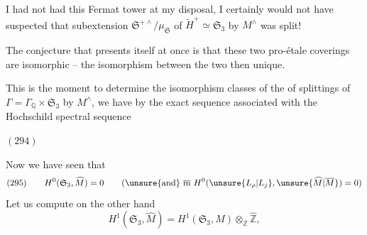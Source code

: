 I had not had this Fermat tower at my disposal, I certainly would not have suspected that  subextension $\mathfrak S^{+\wedge}/\mu_{\mathfrak S}$  of $\widetilde H^+\simeq\mathfrak S_3$ by $M^{\wedge}$ was split!

The conjecture that presents itself at once is that these two pro-étale coverings are isomorphic -- the isomorphism between the two  then unique.


 This is the moment to determine the isomorphism classes of the  of splittings of  $\Gamma=\Gamma_{\mathbb Q}\times\mathfrak S_3$ by $M^{\wedge}$, we have by the exact sequence associated with the Hochschild spectral sequence

\begin{samepage}
$(294)$\quad
{}
\end{samepage}

Now we have seen that
\[
(295)\qquad H^0(\mathfrak S_3,\widehat M)=0
\qquad(\text{\unsure{and} }\overline{\mathrm m}\ H^0(\unsure{L_\rho|L_j},\unsure{\widehat M|\overline M})=0)
\]
 Let us compute on the other hand
\[
H^1(\mathfrak S_3,\widehat M)=H^1(\mathfrak S_3,M)\otimes_{\mathbb Z}\widehat{\mathbb Z},
\]



